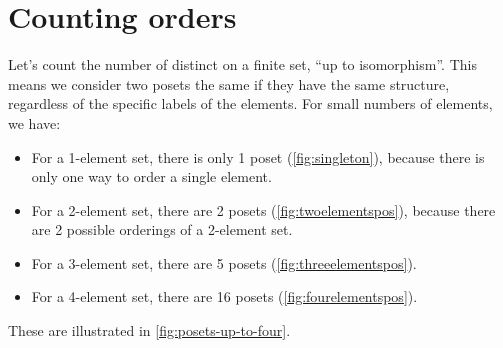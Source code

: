 \section{Counting orders}


Let's count the number of distinct  on a finite set, ``up to isomorphism''.
This means we consider two posets the same if they have the same structure, regardless of the specific labels of the elements.
For small numbers of elements, we have:
\begin{itemize}
    \item For a 1-element set, there is only 1 poset (\cref{fig:singleton}), because there is only one way to order a single element.
    \item For a 2-element set, there are 2 posets (\cref{fig:twoelementspos}), because there are 2 possible orderings of a 2-element set.
    \item For a 3-element set, there are 5 posets (\cref{fig:threeelementspos}).
    \item For a 4-element set, there are 16 posets (\cref{fig:fourelementspos}).
\end{itemize}
These are illustrated in \cref{fig:posets-up-to-four}.

\vfill


